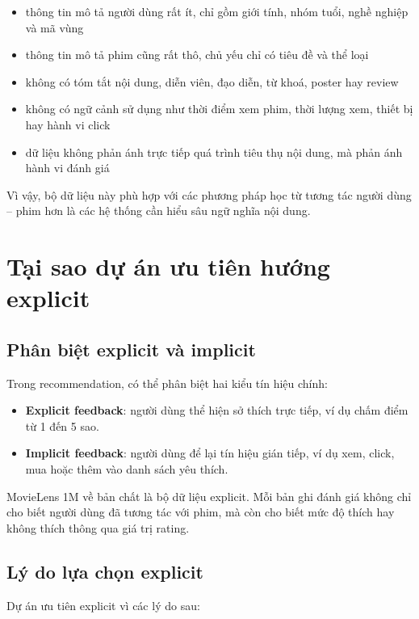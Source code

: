 \documentclass[12pt,a4paper]{article}
\begin{document}
\begin{itemize}[leftmargin=1.5cm]
    \item thông tin mô tả người dùng rất ít, chỉ gồm giới tính, nhóm tuổi, nghề nghiệp và mã vùng
    \item thông tin mô tả phim cũng rất thô, chủ yếu chỉ có tiêu đề và thể loại
    \item không có tóm tắt nội dung, diễn viên, đạo diễn, từ khoá, poster hay review
    \item không có ngữ cảnh sử dụng như thời điểm xem phim, thời lượng xem, thiết bị hay hành vi click
    \item dữ liệu không phản ánh trực tiếp quá trình tiêu thụ nội dung, mà phản ánh hành vi đánh giá
\end{itemize}

Vì vậy, bộ dữ liệu này phù hợp với các phương pháp học từ tương tác người dùng -- phim hơn là các hệ thống cần hiểu sâu ngữ nghĩa nội dung.

\section{Tại sao dự án ưu tiên hướng explicit}

\subsection{Phân biệt explicit và implicit}

Trong recommendation, có thể phân biệt hai kiểu tín hiệu chính:

\begin{itemize}[leftmargin=1.5cm]
    \item \textbf{Explicit feedback}: người dùng thể hiện sở thích trực tiếp, ví dụ chấm điểm từ 1 đến 5 sao.
    \item \textbf{Implicit feedback}: người dùng để lại tín hiệu gián tiếp, ví dụ xem, click, mua hoặc thêm vào danh sách yêu thích.
\end{itemize}

MovieLens 1M về bản chất là bộ dữ liệu explicit. Mỗi bản ghi đánh giá không chỉ cho biết người dùng đã tương tác với phim, mà còn cho biết mức độ thích hay không thích thông qua giá trị rating.

\subsection{Lý do lựa chọn explicit}

Dự án ưu tiên explicit vì các lý do sau:
\end{document}
